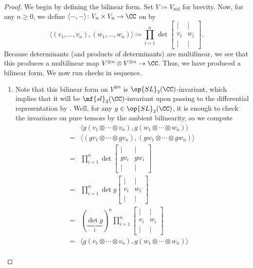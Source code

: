 \documentclass[../notes.tex]{subfiles}
\begin{document}
\begin{proof}
	We begin by defining the bilinear form. Set $V\coloneqq V_{\mathrm{std}}$ for brevity. Now, for any $n\ge0$, we define $\langle-,-\rangle\colon V_n\times V_n\to\CC$ on by
	\[\big\langle(v_1,\ldots,v_n),(w_1,\ldots,w_n)\big\rangle\coloneqq\prod_{i=1}^n\det\begin{bmatrix}
		| & | \\
		v_i & w_i \\
		| & |
	\end{bmatrix}.\]
	Because determinants (and products of determinants) are multilinear, we see that this produces a multilinear map $V^{\otimes n}\otimes V^{\otimes n}\to\CC$. Thus, we have produced a bilinear form. We now run checks in sequence.
	\begin{enumerate}
		\item Note that this bilinear form on $V^{\otimes n}$ is $\op{SL}_2(\CC)$-invariant, which implies that it will be $\mf{sl}_2(\CC)$-invariant upon passing to the differential representation by . Well, for any $g\in\op{SL}_2(\CC)$, it is enough to check the invariance on pure tensors by the ambient bilinearity, so we compute
		\begin{align*}
			& \big\langle g(v_1\otimes\cdots\otimes v_n),g(w_1\otimes\cdots\otimes w_n)\big\rangle \\
			={}& \big\langle (gv_1\otimes\cdots\otimes gv_n),(gw_1\otimes\cdots\otimes gw_n)\big\rangle \\
			={}& \prod_{i=1}^n\det\begin{bmatrix}
				| & | \\
				gv_i & gw_i \\
				| & |
			\end{bmatrix} \\
			={}& \prod_{i=1}^n\det g\begin{bmatrix}
				| & | \\
				v_i & w_i \\
				| & |
			\end{bmatrix} \\
			={}& (\underbrace{\det g}_1)^n\prod_{i=1}^n\begin{bmatrix}
				| & | \\
				v_i & w_i \\
				| & |
			\end{bmatrix} \\
			={}& \big\langle g(v_1\otimes\cdots\otimes v_n),g(w_1\otimes\cdots\otimes w_n)\big\rangle \\

\end{align*}
\end{enumerate}
\end{proof}
\end{document}
